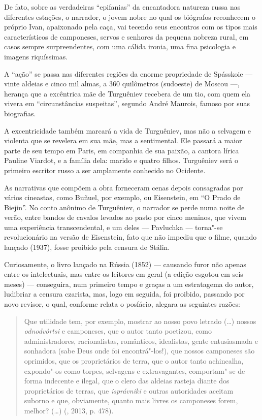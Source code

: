 De fato, sobre as verdadeiras ``epifanias'' da encantadora natureza russa nas diferentes estações, o narrador, o jovem nobre no qual os biógrafos reconhecem o próprio Ivan, apaixonado pela caça, vai tecendo seus encontros com os tipos mais característicos de camponeses, servos e senhores da pequena nobreza rural, em casos sempre surpreendentes, com uma cálida ironia, uma fina psicologia e imagens riquíssimas.

A ``ação'' se passa nas diferentes regiões da enorme propriedade de Spásskoie --- vinte aldeias e cinco mil almas, a 360 quilômetros (sudoeste) de Moscou ---, herança que a excêntrica mãe de Turguêniev recebera de um tio, com quem ela vivera em ``circunstâncias suspeitas'', segundo André Maurois, famoso por suas biografias.

A excentricidade também marcará a vida de Turguêniev, mas não a selvagem e violenta que se revelera em sua mãe, mas a sentimental. Ele passará a maior parte de seu tempo em Paris, em companhia de sua paixão, a cantora lírica Pauline Viardot, e a família dela: marido e quatro filhos. Turguêniev será o primeiro escritor russo a ser amplamente conhecido no
Ocidente.

As narrativas que compõem a obra forneceram cenas depois consagradas por vários cineastas, como Buñuel, por exemplo, ou Eisenstein, em ``O Prado de Biejin''. No conto anônimo de Turguêniev, o narrador se perde numa noite de verão, entre bandos de cavalos levados ao pasto por cinco meninos, que vivem uma experiência transcendental, e um deles --- Pavluchka --- torna"-se revolucionário na versão de Eisenstein, fato que não impediu que o filme, quando lançado (1937), fosse proibido pela
censura de Stálin.

Curiosamente, o livro lançado na Rússia (1852) --- causando furor não apenas entre os intelectuais, mas entre os leitores em geral (a edição esgotou em seis meses) --- conseguira, num primeiro tempo e graças a um estratagema do autor, ludibriar a censura czarista, mas, logo em seguida, foi proibido, passando por novo revisor, o qual, conforme relata o posfácio, alegara as seguintes razões:

\begin{quote}
Que utilidade tem, por exemplo, mostrar ao nosso povo letrado (\ldots{}) nossos \emph{odnodvórtsi} e camponeses, que o autor tanto poetizou, como administradores, racionalistas, românticos, idealistas, gente entusiasmada e sonhadora (sabe Deus onde foi encontrá"-los!), que nossos camponeses são oprimidos, que os proprietários de terra, que o autor tanto achincalha, expondo"-os como torpes, selvagens e extravagantes, comportam"-se de forma indecente e ilegal, que o clero das aldeias rasteja diante dos proprietários de terras, que \emph{isprávniki} e outras autoridades aceitam suborno e que, obviamente, quanto mais livres
os camponeses forem, melhor? (\ldots{}) (, 2013, p. 478).
\end{quote}

